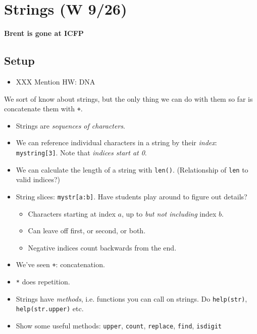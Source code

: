 \documentclass{article}
\begin{document}
\newpage
\section{Strings (W 9/26)}

\textbf{Brent is gone at ICFP}

\subsection*{Setup}
\begin{itemize}
\item XXX Mention HW: DNA
\end{itemize}

We sort of know about strings, but the only thing we can do with them
so far is concatenate them with \verb|+|.

\begin{itemize}
\item Strings are \emph{sequences of characters}.

\item We can reference individual characters in a string by their
  \emph{index}: \verb|mystring[3]|.  Note that \emph{indices start at 0}.

\item We can calculate the length of a string with \verb|len()|.
  (Relationship of \verb|len| to valid indices?)

\item String slices: \verb|mystr[a:b]|.  Have students play around to
  figure out details?
  \begin{itemize}
  \item Characters starting at index $a$, up to \emph{but not
      including} index $b$.
  \item Can leave off first, or second, or both.
  \item Negative indices count backwards from the end.
  \end{itemize}

\item We've seen \verb|+|: concatenation.
\item \verb|*| does repetition.

\item Strings have \emph{methods}, i.e. functions you can call on
  strings.  Do \verb|help(str)|, \verb|help(str.upper)| etc.
\item Show some useful methods: \verb|upper|, \verb|count|,
  \verb|replace|, \verb|find|, \verb|isdigit|
\end{itemize}
\end{document}
